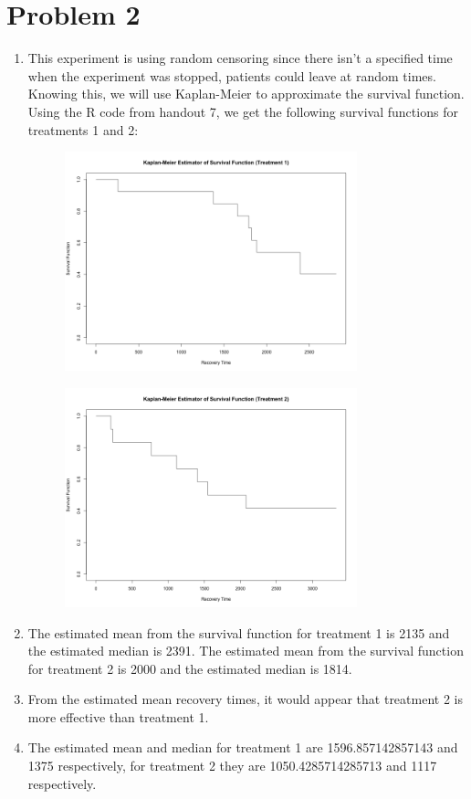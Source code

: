 \documentclass{article}
\begin{document}
\section*{Problem 2}
\begin{enumerate}
\item This experiment is using random censoring since there isn't a specified time when the experiment was stopped, patients could leave at random times. Knowing this, we will use Kaplan-Meier to approximate the survival function. Using the R code from handout 7, we get the following survival functions for treatments 1 and 2: \\
\begin{figure}[htbp]
    \centering
    \includegraphics[width=0.8\textwidth]{treatment1_survival.png}
\end{figure}
\begin{figure}[htbp]
  \centering
  \includegraphics[width=0.8\textwidth]{treatment2_survival.png}
\end{figure}
\newpage
\item The estimated mean from the survival function for treatment 1 is 2135 and the estimated median is 2391. The estimated mean from the survival function for treatment 2 is 2000 and the estimated median is 1814. \\
\item From the estimated mean recovery times, it would appear that treatment 2 is more effective than treatment 1. \\
\item The estimated mean and median for treatment 1 are 1596.857142857143 and 1375 respectively, for treatment 2 they are 1050.4285714285713 and 1117 respectively. \\
\end{enumerate}
\end{document}
